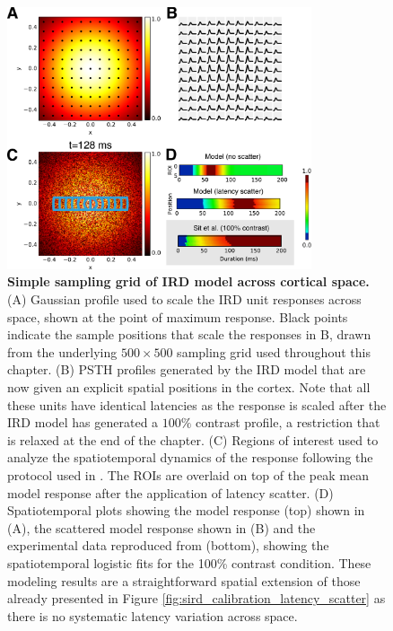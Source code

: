 \documentclass[phd,ianc,twoside]{infthesis}
\begin{document}
\begin{figure}
\center
\includegraphics[width=0.8\textwidth]{./figures/SIRD_calibration_sampling.pdf}
\caption{{\bf Simple sampling grid of IRD model across cortical space.}
  (A) Gaussian profile used to scale the IRD unit responses across
  space, shown at the point of maximum response. Black points indicate
  the sample positions that scale the responses in B, drawn from the
  underlying $500\times500$ sampling grid used throughout this
  chapter. (B) PSTH profiles generated by the IRD model that are now
  given an explicit spatial positions in the cortex. Note that all these
  units have identical latencies as the response is scaled after the IRD
  model has generated a $100\%$ contrast profile, a restriction that is
  relaxed at the end of the chapter. (C) Regions of interest used to
  analyze the spatiotemporal dynamics of the response following the
  protocol used in \citet{sit_neuron09}. The ROIs are overlaid on top of
  the peak mean model response after the application of latency
  scatter. (D) Spatiotemporal plots showing the model response (top)
  shown in (A), the scattered model response shown in (B) and the
  experimental data reproduced from \citet{sit_neuron09} (bottom),
  showing the spatiotemporal logistic fits for the 100\% contrast
  condition.  These modeling results are a straightforward spatial
  extension of those already presented in Figure
  \ref{fig:sird_calibration_latency_scatter} as there is no systematic
  latency variation across space.  }
\label{fig:SIRD_calibration_sampling}
\end{figure}
\end{document}
